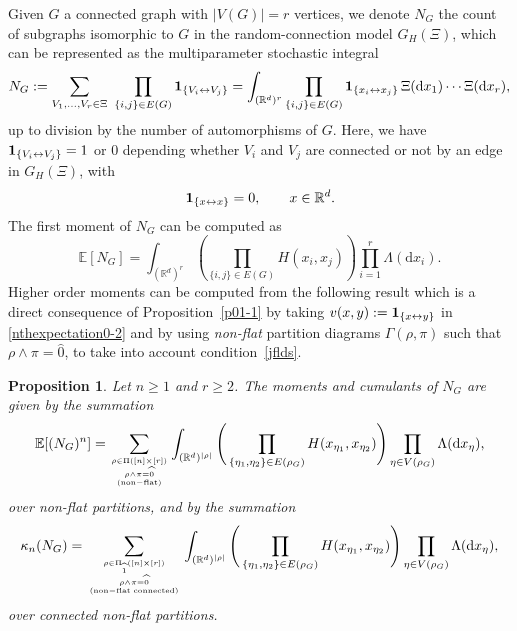 \documentclass[12pt]{article}
\newcommand{\R}{\mathbb{R}}
\newcommand{\E}{\mathbb{E}}
\newcommand{\bone}{{\bf 1}}
\newtheorem{prop}{Proposition}[section]
\def\real{{\mathord{\mathbb R}}}
\numberwithin{equation}{section}
\begin{document}
 Given $G$ a connected graph with $|V(G)| = r$ vertices,
 we denote $N_G$ the count of subgraphs isomorphic to $G$ in the
 random-connection model $G_H( \Xi )$,
 which can be represented as the multiparameter stochastic integral 
\begin{equation}
\nonumber %
  N_G:=\sum_{V_1,\dots,V_r \in\Xi} \ 
  \prod_{\{i,j\} \in E(G)} 
  \bone_{\{V_i\leftrightarrow V_j\}}
  = \int_{(\real^d)^r}
  \prod_{\{i,j\} \in E(G)} 
  \bone_{\{x_i\leftrightarrow x_j\}}
  \ \! \Xi(\mathrm{d}x_1)\cdots \Xi(\mathrm{d}x_r), 
\end{equation}
up to division by the number of automorphisms of $G$.
 Here, we have $\bone_{\{V_i\leftrightarrow V_j\}}=1$ or $0$ depending
whether $V_i$ and $V_j$ are connected or not by an edge
in $G_H(\Xi)$, with 
\begin{equation}
\label{jflds} 
\bone_{\{x\leftrightarrow x\}}=0, \qquad x\in \real^d. 
\end{equation}
\noindent
 The first moment of $N_G$ can be computed as 
\begin{equation}
\label{fm} 
\E [ N_G ] =\int_{(\R^d)^r}\left(\prod_{\{i,j\}\in E(G)}H(x_i,x_j)\right)\prod_{i=1}^r\Lambda(\mathrm{d}x_i).
\end{equation}
 Higher order moments can be computed from the following result which
is a direct consequence of Proposition~\ref{p01-1}
by taking $v(x,y) : = \bone_{\{x \leftrightarrow y\}}$
in \eqref{nthexpectation0-2} and by using
{\em non-flat} partition diagrams $\Gamma(\rho,\pi )$
 such that $\rho \wedge \pi = \widehat{0}$, 
 to take into account condition~\eqref{jflds}.  
\begin{prop}
 \label{lma-diagram1}
  Let $n \geq 1$ and $r\geq 2$.
  The moments and cumulants of $N_G$ are given by the summation 
\begin{equation} 
\label{nthexpectation-2} 
\E [(N_G)^n] =
\sum_{\rho \in \Pi ( [n] \times [r] )
  \atop {
    \rho \wedge \pi = \widehat{0}
    \atop
        {\rm (non-flat)}
  }
}
\int_{(\R^d )^{|\rho |}}
\Bigg(
\prod_{\{\eta_1,\eta_2\} \in E(\rho_G)}
H(x_{\eta_1},x_{\eta_2})
\Bigg)
\prod_{\eta \in V(\rho_G)}
\Lambda (\mathrm{d}x_\eta ), 
\end{equation} 
 over non-flat partitions, and by the summation   
\begin{equation}
  \label{cumulant-diagram1}
  \kappa_n(N_G)=\sum_{\rho \in \Pi_{\widehat{1}} ( [n] \times [r])
    \atop
    {\rho \wedge \pi = \widehat{0}
    \atop {\rm (non-flat \ \! connected)}}
  }
  \int_{(\R^d )^{|\rho |}}
  \Bigg(
\prod_{\{\eta_1,\eta_2\} \in E(\rho_G)}
H(x_{\eta_1},x_{\eta_2})
\Bigg)
\prod_{\eta \in V(\rho_G)}
\Lambda (\mathrm{d}x_\eta ), 
\end{equation} 
 over connected non-flat partitions. 
\end{prop}
\end{document}
